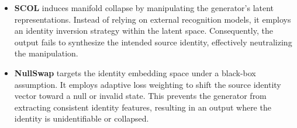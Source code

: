 \documentclass{article}
\begin{document}
\begin{itemize}[leftmargin=*, nosep]
    \item \textbf{SCOL} induces manifold collapse by manipulating the generator's latent representations. Instead of relying on external recognition models, it employs an identity inversion strategy within the latent space. Consequently, the output fails to synthesize the intended source identity, effectively neutralizing the manipulation.
    \item \textbf{NullSwap} targets the identity embedding space under a black-box assumption. It employs adaptive loss weighting to shift the source identity vector toward a null or invalid state. This prevents the generator from extracting consistent identity features, resulting in an output where the identity is unidentifiable or collapsed.
\end{itemize}



\end{document}
